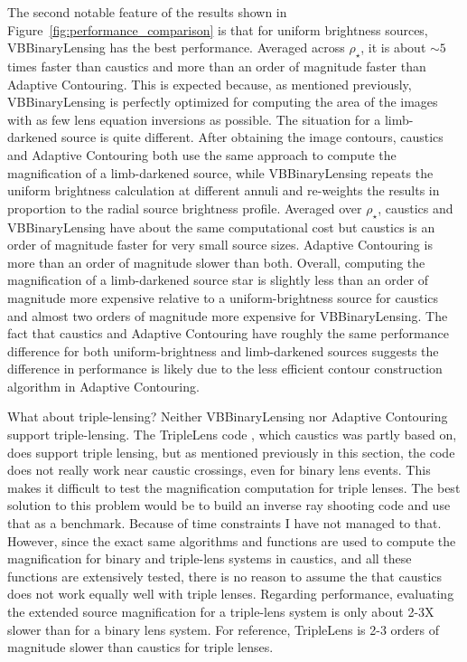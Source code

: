 \documentclass[12pt,dvipsnames]{report}
\newcommand{\ssf}[1]{\textsf{#1}}
\begin{document}
The second notable feature of the results shown in Figure~\ref{fig:performance_comparison}
is that for uniform brightness sources, \ssf{VBBinaryLensing} has the best performance.
Averaged across $\rho_\star$, it is about $\sim 5$ times faster than \ssf{caustics} and 
more than an order of magnitude faster than \ssf{Adaptive Contouring}. This is expected
because, as mentioned previously, \ssf{VBBinaryLensing} is perfectly optimized for 
computing the area of the images with as few lens equation inversions as possible. 
The situation for a limb-darkened source is quite different. After obtaining the 
image contours, \ssf{caustics} and \ssf{Adaptive Contouring} both use the same approach 
to compute the magnification of a limb-darkened source, while \ssf{VBBinaryLensing} repeats
the uniform brightness calculation at different annuli and re-weights the results in proportion to 
the radial source brightness profile. Averaged over $\rho_\star$, \ssf{caustics} and 
\ssf{VBBinaryLensing} have about the same computational cost but \ssf{caustics} is an order 
of magnitude faster for very small source sizes. \ssf{Adaptive Contouring} is more than an 
order of magnitude slower than both. Overall, computing the magnification of a limb-darkened 
source star is slightly less than an order of magnitude more expensive relative to 
a uniform-brightness source for \ssf{caustics} and almost two orders of magnitude more 
expensive for \ssf{VBBinaryLensing}. 
The fact that \ssf{caustics} and \ssf{Adaptive Contouring} have roughly the same performance 
difference for both uniform-brightness and limb-darkened sources suggests the difference 
in performance is likely due to the less efficient contour construction algorithm  in 
\ssf{Adaptive Contouring}.

What about triple-lensing? Neither \ssf{VBBinaryLensing} nor \ssf{Adaptive Contouring} 
support triple-lensing. The \ssf{TripleLens} code \citep{2021MNRAS.503.6143K}, which 
\ssf{caustics} was partly based on, does support triple 
lensing, but as mentioned previously in this section, the code does not really work
near caustic crossings, even for binary lens events. 
This makes it difficult to test the magnification computation for triple lenses. The 
best solution to this problem would be to build an inverse ray shooting code and use that
as a benchmark. Because of time constraints I have not managed to that. 
However, since the exact same algorithms and functions are 
used to compute the magnification for binary and triple-lens systems in \ssf{caustics},
and all these functions are extensively tested, there is no reason to assume the that 
\ssf{caustics} does not work equally well with triple lenses. 
Regarding performance, evaluating the extended source magnification for a triple-lens system 
is only about 2-3X slower than for a binary lens system. 
For reference, \ssf{TripleLens} is 2-3 orders of magnitude slower than \ssf{caustics} for 
triple lenses.
\end{document}
